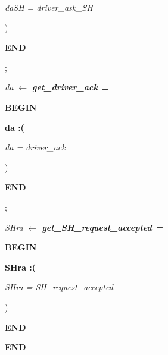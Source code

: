 \documentclass[11pt]{article}
\begin{document}
\begin{sloppypar}
\hspace*{0.60in}\it daSH \rm = \it driver\_ask\_SH

\hspace*{0.60in}\rm )

\hspace*{0.20in}\bf END

\hspace*{0.20in}

\hspace*{0.20in}\rm ;

\hspace*{0.20in}

\hspace*{0.20in}\it da  $\leftarrow$  \bf get\_driver\_ack \rm = 

\hspace*{0.20in}\bf BEGIN

\hspace*{0.40in}\bf da \rm :\rm (

\hspace*{0.60in}\it da \rm = \it driver\_ack

\hspace*{0.60in}\rm )

\hspace*{0.20in}\bf END

\hspace*{0.40in}\rm ;

\hspace*{0.20in}

\hspace*{0.20in}\it SHra  $\leftarrow$  \bf get\_SH\_request\_accepted \rm = 

\hspace*{0.20in}\bf BEGIN

\hspace*{0.40in}\bf SHra \rm :\rm (

\hspace*{0.60in}\it SHra \rm = \it SH\_request\_accepted

\hspace*{0.60in}\rm )

\hspace*{0.20in}\bf END

\hspace*{0.20in}

\vspace*{12mm}
\bf END

\newpage
\end{sloppypar}
\end{document}
